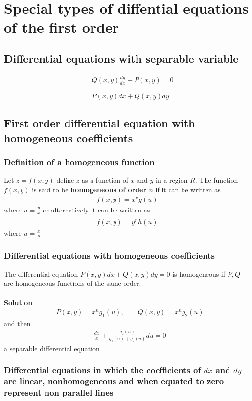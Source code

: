 \documentclass[11pt,a4paper,final]{article}
\author{Anoynmous}
\begin{document}
\section{Special types of diffential equations of the first order}
\subsection{Differential equations with separable variable}
\begin{align}
	& Q(x,y)\frac{dy}{dx} + P(x,y) = 0 \\
	= \\
	& P(x,y)dx + Q(x,y)dy
\end{align}

\subsection{First order differential equation with homogeneous coefficients}
\subsubsection{Definition of a homogeneous function}
Let $z = f(x,y)$ define $z$ as a function of $x$ and $y$ in a region $R$. The function $f(x,y)$ is said to be \textbf{homogeneous of order $n$} if it can be written as
\begin{align}
	f(x,y) = x^n g(u)
\end{align}
where $u = \frac{y}{x}$ or alternatively it can be written as 
\begin{align}
	\\ f(x,y) = y^n h(u)
\end{align}
where $u = \frac{x}{y}$

\subsubsection{Differential equations with homogeneous coefficients}
The differential equation $P(x,y)dx + Q(x,y)dy = 0$ is homogeneous if $P,Q$ are homogeneous functions of the same order.
\\
\\
\textbf{Solution}
\\
\begin{align*}
	& P(x,y) = x^n g_1(u), \qquad Q(x,y) = x^n g_2(u)
\end{align*}
and then
\begin{align}
	& \frac{dx}{x} + \frac{g_2(u)}{g_1(u) + g_2 (u)}du = 0
\end{align}
a separable differential equation
\subsubsection{Differential equations in which the coefficients of $dx$ and $dy$ are linear, nonhomogeneous and when equated to zero represent non parallel lines}
\end{document}
